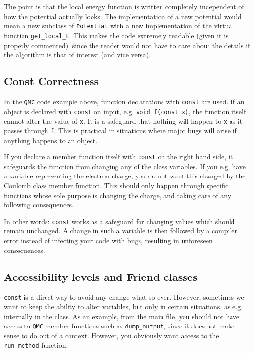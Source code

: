 The point is that the local energy function is written completely independent of how the potential actually looks. The implementation of a new potential would mean a new subclass of \verb+Potential+ with a new implementation of the virtual function \verb+get_local_E+. This makes the code extremely readable (given it is properly commented), since the reader would not have to care about the details if the algorithm is that of interest (and vice versa).

\subsection{Const Correctness}

In the \verb+QMC+ code example above, function declarations with \verb+const+ are used. If an object is declared with \verb+const+ on input, e.g. \verb+void f(const x)+, the function itself cannot alter the value of \verb+x+. It is a safeguard that nothing will happen to \verb+x+ as it passes through \verb+f+. This is practical in situations where major bugs will arise if anything happens to an object.

If you declare a member function itself with \verb+const+ on the right hand side, it safeguards the function from changing any of the class variables. If you e.g. have a variable representing the electron charge, you do not want this changed by the Coulomb class member function. This should only happen through specific functions whose sole purpose is changing the charge, and taking care of any following consequences. 

In other words: \verb+const+ works as a safeguard for changing values which should remain unchanged. A change in such a variable is then followed by a compiler error instead of infecting your code with bugs, resulting in unforeseen consequences.

\subsection{Accessibility levels and Friend classes}

\verb+const+ is a direct way to avoid any change what so ever. However, sometimes we want to keep the ability to alter variables, but only in certain situations, as e.g. internally in the class. As an example, from the main file, you should not have access to \verb+QMC+ member functions such as \verb+dump_output+, since it does not make sense to do out of a context. However, you obviously want access to the \verb+run_method+ function.


